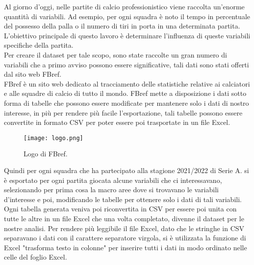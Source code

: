 Al giorno d'oggi, nelle partite di calcio professionistico viene raccolta un'enorme quantità di variabili. Ad esempio, per ogni squadra è noto il tempo in percentuale del possesso della palla o il numero di tiri in porta in una determinata partita. L'obiettivo principale di questo lavoro è determinare l'influenza di queste variabili specifiche della partita. \\
Per creare il dataset per tale scopo, sono state raccolte un gran numero di variabili che a primo avviso possono essere significative, tali dati sono stati offerti dal sito web FBref.\\
FBref è un sito web dedicato al tracciamento delle statistiche relative ai calciatori e alle squadre di calcio di tutto il mondo. FBref mette a disposizione i dati sotto forma di tabelle che possono essere modificate per mantenere solo i dati di nostro interesse, in più per rendere più facile l'esportazione, tali tabelle possono essere convertite in formato CSV per poter essere poi trasportate in un file Excel.\\
\begin{figure}[!htb]
	\begin{center}
		\texttt{[image: logo.png]}
		\caption{Logo di FBref.} 
		\label{fig:logo}
	\end{center}
\end{figure}



Quindi per ogni squadra che ha partecipato alla stagione 2021/2022 di Serie A. si è esportato per ogni partita giocata alcune variabili che ci interessavano, selezionando per prima cosa la macro aree dove si trovavano le variabili d'interesse e poi, modificando le tabelle per ottenere solo i dati di tali variabili. Ogni tabella generata veniva poi riconvertita in CSV per essere poi unita con tutte le altre in un file Excel che una volta completato, divenne il dataset per le nostre analisi. Per rendere più leggibile il file Excel, dato che le stringhe in CSV separavano i dati con il carattere separatore virgola, si è utilizzata la funzione di Excel "trasforma testo in colonne" per inserire tutti i dati in modo ordinato nelle celle del foglio Excel.

